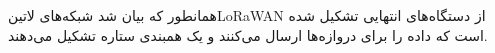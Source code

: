 
همانطور که بیان شد شبکه‌های ‌لاتین{LoRaWAN} از دستگاه‌های انتهایی تشکیل شده است که داده را برای دروازه‌ها ارسال می‌کنند و یک همبندی ستاره تشکیل می‌دهند.
